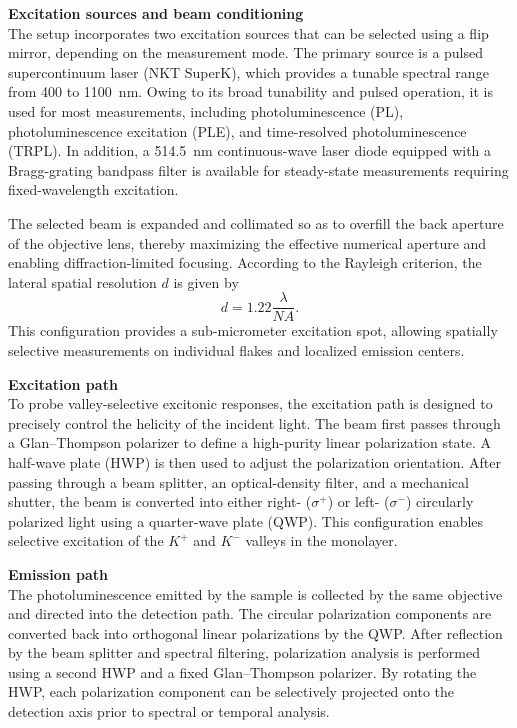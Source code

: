 \vspace{1em}
\noindent \textbf{Excitation sources and beam conditioning} \\

The setup incorporates two excitation sources that can be selected using a flip mirror, depending on the measurement mode. The primary source is a pulsed supercontinuum laser (NKT SuperK), which provides a tunable spectral range from 400 to 1100~nm. Owing to its broad tunability and pulsed operation, it is used for most measurements, including photoluminescence (PL), photoluminescence excitation (PLE), and time-resolved photoluminescence (TRPL). In addition, a 514.5~nm continuous-wave laser diode equipped with a Bragg-grating bandpass filter is available for steady-state measurements requiring fixed-wavelength excitation.

The selected beam is expanded and collimated so as to overfill the back aperture of the objective lens, thereby maximizing the effective numerical aperture and enabling diffraction-limited focusing. According to the Rayleigh criterion, the lateral spatial resolution $d$ is given by
\begin{equation}
d = 1.22 \frac{\lambda}{NA}.
\end{equation}
This configuration provides a sub-micrometer excitation spot, allowing spatially selective measurements on individual flakes and localized emission centers.




\vspace{1em}
\noindent \textbf{Excitation path} \\

To probe valley-selective excitonic responses, the excitation path is designed to precisely control the helicity of the incident light. The beam first passes through a Glan--Thompson polarizer to define a high-purity linear polarization state. A half-wave plate (HWP) is then used to adjust the polarization orientation. After passing through a beam splitter, an optical-density filter, and a mechanical shutter, the beam is converted into either right- ($\sigma^+$) or left- ($\sigma^-$) circularly polarized light using a quarter-wave plate (QWP). This configuration enables selective excitation of the $K^+$ and $K^-$ valleys in the monolayer.

\vspace{1em}
\noindent \textbf{Emission path} \\

The photoluminescence emitted by the sample is collected by the same objective and directed into the detection path. The circular polarization components are converted back into orthogonal linear polarizations by the QWP. After reflection by the beam splitter and spectral filtering, polarization analysis is performed using a second HWP and a fixed Glan--Thompson polarizer. By rotating the HWP, each polarization component can be selectively projected onto the detection axis prior to spectral or temporal analysis.



